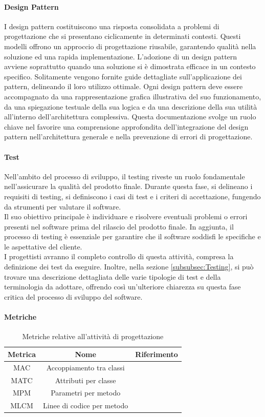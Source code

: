\paragraph{Design Pattern}
I design pattern costituiscono una risposta consolidata a problemi di progettazione che si presentano ciclicamente in determinati contesti. Questi modelli offrono un approccio di progettazione riusabile, garantendo qualità nella soluzione ed una rapida implementazione.
L'adozione di un design pattern avviene soprattutto quando una soluzione si è dimostrata efficace in un contesto specifico. Solitamente vengono fornite guide dettagliate sull'applicazione dei pattern, delineando il loro utilizzo ottimale.
Ogni design pattern deve essere accompagnato da una rappresentazione grafica illustrativa del suo funzionamento, da una spiegazione testuale della sua logica e da una descrizione della sua utilità all'interno dell'architettura complessiva. Questa documentazione svolge un ruolo chiave nel favorire una comprensione approfondita dell'integrazione del design pattern nell'architettura generale e nella prevenzione di errori di progettazione.

\paragraph{Test}
Nell'ambito del processo di sviluppo, il testing riveste un ruolo fondamentale nell'assicurare la qualità del prodotto finale. Durante questa fase, si delineano i requisiti di testing, si definiscono i casi di test e i criteri di accettazione, fungendo da strumenti per valutare il software. \\
Il suo obiettivo principale è individuare e risolvere eventuali problemi o errori presenti nel software prima del rilascio del prodotto finale. In aggiunta, il processo di testing è essenziale per garantire che il software soddisfi le specifiche e le aspettative del cliente. \\
I progettisti avranno il completo controllo di questa attività, compresa la definizione dei test da eseguire. Inoltre, nella sezione \ref{subsubsec:Testing}, si può trovare una descrizione dettagliata delle varie tipologie di test e della terminologia da adottare, offrendo così un'ulteriore chiarezza su questa fase critica del processo di sviluppo del software.

\paragraph{Metriche}
\begin{table}[H]
    \centering
    \begin{tabular}{|c|c|c|}
    \hline
    Metrica & Nome & Riferimento \\
    \hline \hline
    MAC & Accoppiamento tra classi &  \\
    MATC & Attributi per classe &  \\
    MPM & Parametri per metodo & \\
    MLCM & Linee di codice per metodo &  \\ 
    \hline
    \end{tabular}
    \caption{Metriche relative all'attività di progettazione}
\end{table}

